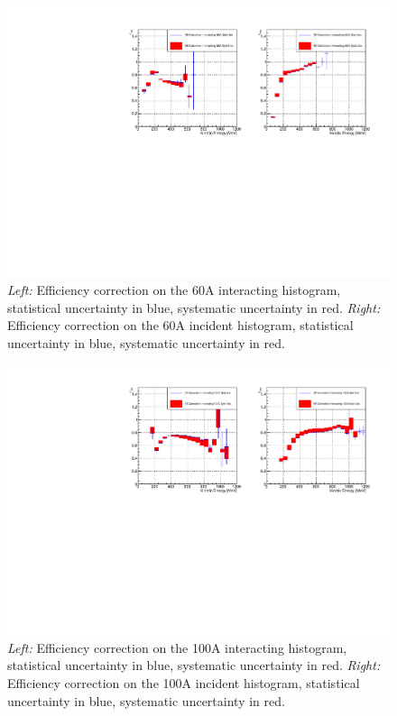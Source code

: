 \begin{figure}[p]
\centering
\includegraphics[width=\textwidth]{Chapter-6/Images/60AEffCorr.pdf}
\caption{\emph{Left:} Efficiency correction on the 60A interacting histogram, statistical uncertainty in blue, systematic uncertainty in red. \emph{Right:}  Efficiency correction on the 60A incident histogram, statistical uncertainty in blue, systematic uncertainty in red.}
\label{fig:EffCorr60A}
\end{figure}

\begin{figure}[p]
\centering
\includegraphics[width=\textwidth]{Chapter-6/Images/100AEffCorr.pdf}
\caption{\emph{Left:} Efficiency correction on the 100A interacting histogram, statistical uncertainty in blue, systematic uncertainty in red. \emph{Right:}  Efficiency correction on the 100A incident histogram, statistical uncertainty in blue, systematic uncertainty in red.}
\label{fig:EffCorr100A}
\end{figure}



